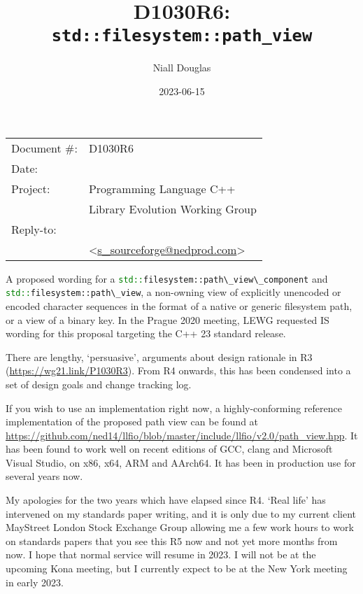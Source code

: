 \documentclass[11pt]{article}
\date{}
\title{D1030R6: \texttt{std::filesystem::path\_view}}
\makeatletter
\newcommand{\code}[2][cpp]{\lstinline[language=#1,basicstyle=\small\ttfamily]{#2}}
\newcommand{\emailaddress}{s\_sourceforge@nedprod.com}
\newcommand{\email}{\href{mailto:\emailaddress}{\emailaddress}}
\makeatother
\begin{document}
\maketitle\vspace{-2cm}

\begin{flushright}
  \begin{tabular}{ll}
  Document \#:&D1030R6\\
  Date:       &\date{2023-06-15}\\
  Project:    &Programming Language C++\\
              &Library Evolution Working Group\\
  Reply-to:   &\author{Niall Douglas}\\
              &\textless\email\textgreater
  \end{tabular}
\end{flushright}

A proposed wording for a \code{std::filesystem::path\_view\_component} and \code{std::filesystem::path\_view}, a non-owning view of explicitly unencoded or encoded character sequences in the format of a native or generic filesystem path, or a view of a binary key. In the Prague 2020 meeting, LEWG requested IS wording for this proposal targeting the C++ 23 standard release.

There are lengthy, `persuasive', arguments about design rationale in R3 (\url{https://wg21.link/P1030R3}). From R4 onwards, this has been condensed into a set of design goals and change tracking log.

If you wish to use an implementation right now, a highly-conforming reference implementation of the proposed path view can be found at \url{https://github.com/ned14/llfio/blob/master/include/llfio/v2.0/path\_view.hpp}. It has been found to work well on recent editions of GCC, clang and Microsoft Visual Studio, on x86, x64, ARM and AArch64. It has been in production use for several years now.

My apologies for the two years which have elapsed since R4. `Real life' has intervened on my standards paper writing, and it is only due to my current client MayStreet London Stock Exchange Group allowing me a few work hours to work on standards papers that you see this R5 now and not yet more months from now. I hope that normal service will resume in 2023. I will not be at the upcoming Kona meeting, but I currently expect to be at the New York meeting in early 2023.

\tableofcontents
\end{document}
